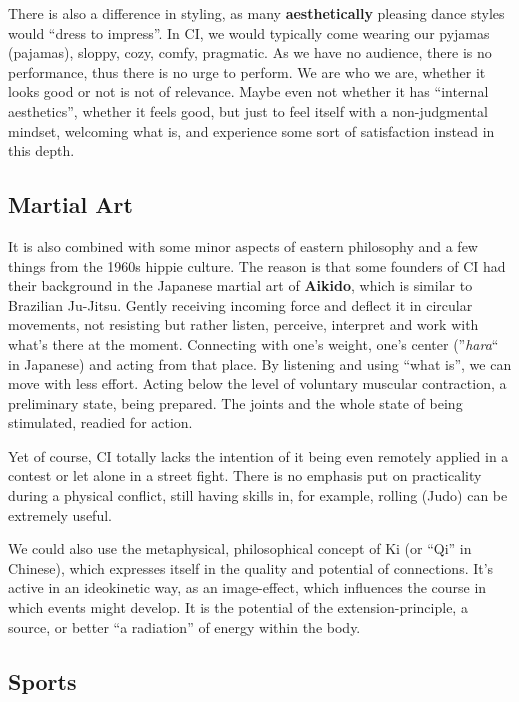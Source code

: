 There is also a difference in styling, as many \textbf{aesthetically} pleasing dance styles would ``dress to impress''.
In CI, we would typically come wearing our pyjamas (pajamas), sloppy, cozy, comfy, pragmatic.
As we have no audience, there is no performance, thus there is no urge to perform.
We are who we are, whether it looks good or not is not of relevance.
Maybe even not whether it has ``internal aesthetics'', whether it feels good, but just to feel itself with a non-judgmental mindset, welcoming what is, and experience some sort of satisfaction instead in this depth.

\subsection{Martial Art}\label{subsec:martial-art}

It is also combined with some minor aspects of eastern philosophy and a few things from the 1960s hippie culture.
The reason is that some founders of CI had their background in the Japanese martial art of \textbf{Aikido}, which is similar to Brazilian Ju-Jitsu.
Gently receiving incoming force and deflect it in circular movements, not resisting but rather listen, perceive, interpret and work with what's there at the moment.
Connecting with one's weight, one's center (''\textit{hara}`` in Japanese) and acting from that place.
By listening and using ``what is'', we can move with less effort.
Acting below the level of voluntary muscular contraction, a preliminary state, being prepared.
The joints and the whole state of being stimulated, readied for action.

Yet of course, CI totally lacks the intention of it being even remotely applied in a contest or let alone in a street fight.
There is no emphasis put on practicality during a physical conflict, still having skills in, for example, rolling (Judo) can be extremely useful.

We could also use the metaphysical, philosophical concept of Ki (or ``Qi'' in Chinese), which expresses itself in the quality and potential of connections.
It's active in an ideokinetic way, as an image-effect, which influences the course in which events might develop.
It is the potential of the extension-principle, a source, or better ``a radiation'' of energy within the body.

\subsection{Sports}\label{subsec:sports}

